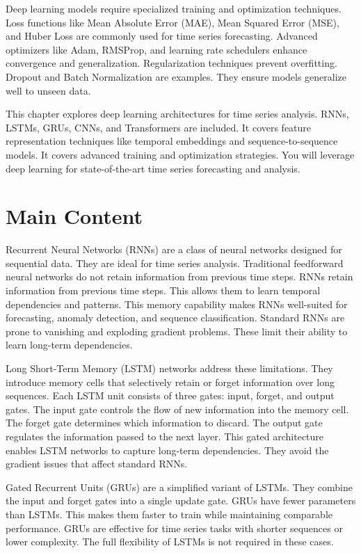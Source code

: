 Deep learning models require specialized training and optimization techniques. Loss functions like Mean Absolute Error (MAE), Mean Squared Error (MSE), and Huber Loss are commonly used for time series forecasting. Advanced optimizers like Adam, RMSProp, and learning rate schedulers enhance convergence and generalization. Regularization techniques prevent overfitting. Dropout and Batch Normalization are examples. They ensure models generalize well to unseen data.

This chapter explores deep learning architectures for time series analysis. RNNs, LSTMs, GRUs, CNNs, and Transformers are included. It covers feature representation techniques like temporal embeddings and sequence-to-sequence models. It covers advanced training and optimization strategies. You will leverage deep learning for state-of-the-art time series forecasting and analysis.



\section{Main Content}

Recurrent Neural Networks (RNNs) are a class of neural networks designed for sequential data. They are ideal for time series analysis. Traditional feedforward neural networks do not retain information from previous time steps. RNNs retain information from previous time steps. This allows them to learn temporal dependencies and patterns. This memory capability makes RNNs well-suited for forecasting, anomaly detection, and sequence classification. Standard RNNs are prone to vanishing and exploding gradient problems. These limit their ability to learn long-term dependencies.

Long Short-Term Memory (LSTM) networks address these limitations. They introduce memory cells that selectively retain or forget information over long sequences. Each LSTM unit consists of three gates: input, forget, and output gates. The input gate controls the flow of new information into the memory cell. The forget gate determines which information to discard. The output gate regulates the information passed to the next layer. This gated architecture enables LSTM networks to capture long-term dependencies. They avoid the gradient issues that affect standard RNNs.

Gated Recurrent Units (GRUs) are a simplified variant of LSTMs. They combine the input and forget gates into a single update gate. GRUs have fewer parameters than LSTMs. This makes them faster to train while maintaining comparable performance. GRUs are effective for time series tasks with shorter sequences or lower complexity. The full flexibility of LSTMs is not required in these cases.

